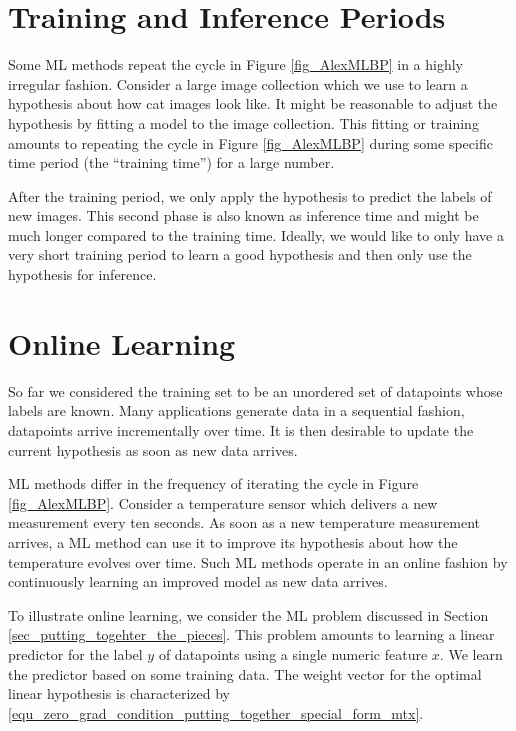 \documentclass[12pt]{report}
\begin{document}
\section{Training and Inference Periods} 
\label{sec_training_inference} 

Some ML methods repeat the cycle in Figure \ref{fig_AlexMLBP} in a 
highly irregular fashion. Consider a large image collection which we 
use to learn a hypothesis about how cat images look like. It might 
be reasonable to adjust the hypothesis by fitting a model to the image 
collection. This fitting or training amounts to repeating the 
cycle in Figure \ref{fig_AlexMLBP} during some specific time period 
(the ``training time'') for a large number. 

After the training period, we only apply the hypothesis to predict 
the labels of new images. This second phase is also known 
as inference time and might be much longer compared to the 
training time. Ideally, we would like to only have a very short 
training period to learn a good hypothesis and then only use 
the hypothesis for inference. 

\section{Online Learning} 
\label{sec_online_learning}

So far we considered the training set to be an unordered set of datapoints 
whose labels are known. Many applications generate data in a sequential 
fashion, datapoints arrive incrementally over time. It is then desirable to update 
the current hypothesis as soon as new data arrives. 

ML methods differ in the frequency of iterating the cycle in Figure \ref{fig_AlexMLBP}. Consider a 
temperature sensor which delivers a new measurement every ten seconds. As soon as a new 
temperature measurement arrives, a ML method can use it to improve its hypothesis about 
how the temperature evolves over time. Such ML methods operate in an online fashion by 
continuously learning an improved model as new data arrives.  

To illustrate online learning, we consider the ML problem discussed in Section \ref{sec_putting_togehter_the_pieces}. 
This problem amounts to learning a linear predictor for the label $y$ of datapoints 
using a single numeric feature $x$. We learn the predictor based on some training 
data. The weight vector for the optimal linear hypothesis is characterized by \eqref{equ_zero_grad_condition_putting_together_special_form_mtx}. 
\end{document}
